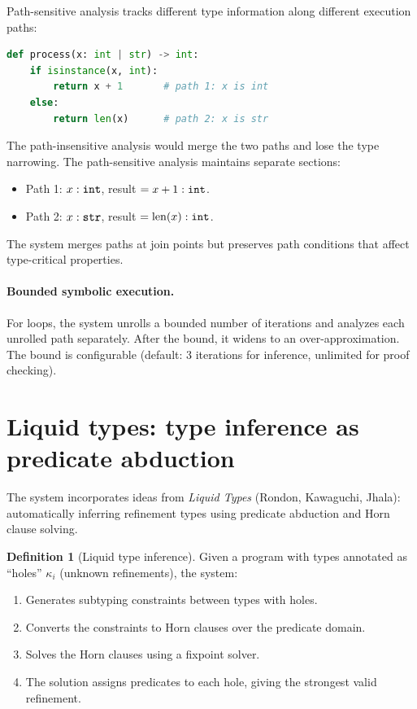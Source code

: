 \documentclass[11pt]{report}
\DeclareRobustCommand{\py}[1]{\texttt{\detokenize{#1}}}
\theoremstyle{definition}
\newtheorem{definition}{Definition}[section]
\theoremstyle{plain}
\begin{document}
Path-sensitive analysis tracks different type information along different
execution paths:

\begin{lstlisting}[style=deppy,language=Python]
def process(x: int | str) -> int:
    if isinstance(x, int):
        return x + 1       # path 1: x is int
    else:
        return len(x)      # path 2: x is str
\end{lstlisting}

The path-insensitive analysis would merge the two paths and lose the type
narrowing. The path-sensitive analysis maintains separate sections:
\begin{itemize}[nosep]
  \item Path 1: $x : \py{int}$, result $= x + 1 : \py{int}$.
  \item Path 2: $x : \py{str}$, result $= \mathrm{len}(x) : \py{int}$.
\end{itemize}

The system merges paths at join points but preserves path conditions that
affect type-critical properties.

\paragraph{Bounded symbolic execution.}
For loops, the system unrolls a bounded number of iterations and analyzes
each unrolled path separately. After the bound, it widens to an
over-approximation. The bound is configurable (default: 3 iterations for
inference, unlimited for proof checking).

\section{Liquid types: type inference as predicate abduction}

The system incorporates ideas from \emph{Liquid Types} (Rondon, Kawaguchi,
Jhala): automatically inferring refinement types using predicate abduction
and Horn clause solving.

\begin{definition}[Liquid type inference]
Given a program with types annotated as ``holes'' $\kappa_i$ (unknown
refinements), the system:
\begin{enumerate}[nosep]
  \item Generates subtyping constraints between types with holes.
  \item Converts the constraints to Horn clauses over the predicate domain.
  \item Solves the Horn clauses using a fixpoint solver.
  \item The solution assigns predicates to each hole, giving the strongest
        valid refinement.
\end{enumerate}
\end{definition}
\end{document}
